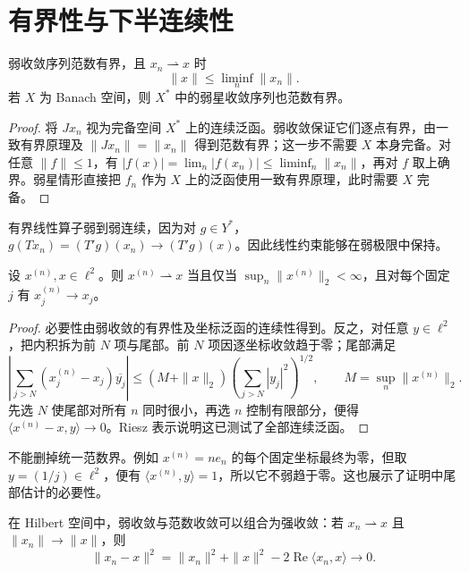 \documentclass[UTF8,12pt,a4paper,fontset=fandol]{ctexbook}
\begin{document}
\section{有界性与下半连续性}
\begin{proposition}\label{prop:fa-weak-bounds}
弱收敛序列范数有界，且 $x_n\rightharpoonup x$ 时
\[
 \|x\|\leq\liminf_n\|x_n\|.
\]
若 $X$ 为 Banach 空间，则 $X^*$ 中的弱星收敛序列也范数有界。
\end{proposition}
\begin{proof}
将 $Jx_n$ 视为完备空间 $X^*$ 上的连续泛函。弱收敛保证它们逐点有界，由一致有界原理及 $\|Jx_n\|=\|x_n\|$ 得到范数有界；这一步不需要 $X$ 本身完备。对任意 $\|f\|\leq1$，有 $|f(x)|=\lim_n|f(x_n)|\leq\liminf_n\|x_n\|$，再对 $f$ 取上确界。弱星情形直接把 $f_n$ 作为 $X$ 上的泛函使用一致有界原理，此时需要 $X$ 完备。
\end{proof}
有界线性算子弱到弱连续，因为对 $g\in Y^*$，$g(Tx_n)=(T'g)(x_n)\to(T'g)(x)$。因此线性约束能够在弱极限中保持。

\begin{proposition}\label{prop:fa-coordinate-weak}
设 $x^{(n)},x\in\ell^2$。则 $x^{(n)}\rightharpoonup x$ 当且仅当 $\sup_n\|x^{(n)}\|_2<\infty$，且对每个固定 $j$ 有 $x_j^{(n)}\to x_j$。
\end{proposition}
\begin{proof}
必要性由弱收敛的有界性及坐标泛函的连续性得到。反之，对任意 $y\in\ell^2$，把内积拆为前 $N$ 项与尾部。前 $N$ 项因逐坐标收敛趋于零；尾部满足
\[
 \left|\sum_{j>N}(x_j^{(n)}-x_j)\overline{y_j}\right|
 \leq(M+\|x\|_2)\left(\sum_{j>N}|y_j|^2\right)^{1/2},
 \qquad M=\sup_n\|x^{(n)}\|_2.
\]
先选 $N$ 使尾部对所有 $n$ 同时很小，再选 $n$ 控制有限部分，便得 $\langle x^{(n)}-x,y\rangle\to0$。Riesz 表示说明这已测试了全部连续泛函。
\end{proof}

不能删掉统一范数界。例如 $x^{(n)}=ne_n$ 的每个固定坐标最终为零，但取 $y=(1/j)\in\ell^2$，便有 $\langle x^{(n)},y\rangle=1$，所以它不弱趋于零。这也展示了证明中尾部估计的必要性。

在 Hilbert 空间中，弱收敛与范数收敛可以组合为强收敛：若 $x_n\rightharpoonup x$ 且 $\|x_n\|\to\|x\|$，则
\[
 \|x_n-x\|^2=\|x_n\|^2+\|x\|^2-2\operatorname{Re}\langle x_n,x\rangle\to0.
\]
\end{document}
